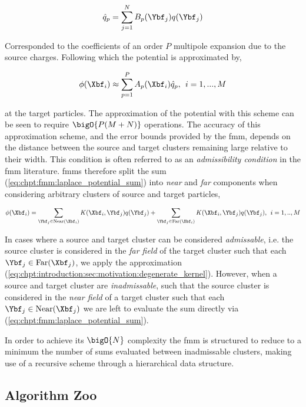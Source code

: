 \begin{equation}
    \hat{q}_p = \sum_{j=1}^N B_p(\Ybf_j)q(\Ybf_j)
\end{equation}

Corresponded to the coefficients of an order $P$ multipole expansion due to the source charges. Following which the potential is approximated by,

\begin{equation}
    \phi(\Xbf_i) \approx \sum_{p=1}^P A_p(\Xbf_i)\hat{q}_p, \> \> i = 1,...,M
\end{equation}

at the target particles. The approximation of the potential with this scheme can be seen to require $\bigO{P(M+N)}$ operations. The accuracy of this approximation scheme, and the error bounds provided by the \acrshort{fmm}, depends on the distance between the source and target clusters remaining large relative to their width. This condition is often referred to as an \textit{admissibility condition} in the \acrshort{fmm} literature. \acrshort{fmm}s therefore split the sum (\ref{eq:chpt:fmm:laplace_potential_sum}) into \textit{near} and \textit{far} components when considering arbitrary clusters of source and target particles,

\begin{equation}
    \phi(\Xbf_i) = \sum_{\Ybf_j \in \text{Near}(\Xbf_i)} K(\Xbf_i, \Ybf_j) q(\Ybf_j) +  \sum_{\Ybf_j \in \text{Far}(\Xbf_i)} K(\Xbf_i, \Ybf_j) q(\Ybf_j), \> \> i=1,..,M
\end{equation}

In cases where a source and target cluster can be considered \textit{admissable}, i.e. the source cluster is considered in the \textit{far field} of the target cluster such that each $\Ybf_j \in \text{Far}(\Xbf_j)$, we apply the approximation (\ref{eq:chpt:introduction:sec:motivation:degenerate_kernel}). However, when a source and target cluster are \textit{inadmissable}, such that the source cluster is considered in the \textit{near field} of a target cluster such that each $\Ybf_j \in \text{Near}(\Xbf_j)$ we are left to evaluate the sum directly via (\ref{eq:chpt:fmm:laplace_potential_sum}).

In order to achieve its $\bigO{N}$ complexity the \acrshort{fmm} is structured to reduce to a minimum the number of sums evaluated between inadmissable clusters, making use of a recursive scheme through a hierarchical data structure.




\subsection{Algorithm Zoo}\label{chpt:fmm:sec:generic:sub:zoo}

